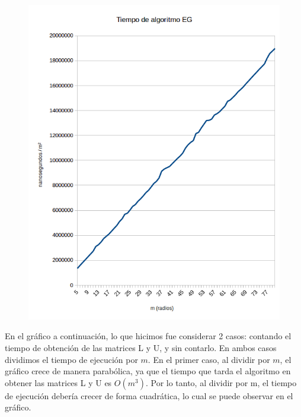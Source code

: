 \begin{figure}[h]
  \center
  \includegraphics[scale=0.8]{imagenes/tiempoEGdivididoM2.png}
  \label{fig:egdivididom2}
\end{figure}

En el gráfico a continuación, lo que hicimos fue considerar 2 casos: contando el tiempo de obtención de las matrices L y U, y sin contarlo. En ambos casos dividimos el tiempo de ejecución por $m$. En el primer caso, al dividir por $m$, el gráfico crece de manera parabólica, ya que el tiempo que tarda el algoritmo en obtener las matrices L y U es $O(m^{3})$. Por lo tanto, al dividir por m, el tiempo de ejecución debería crecer de forma cuadrática, lo cual se puede observar en el gráfico. 


